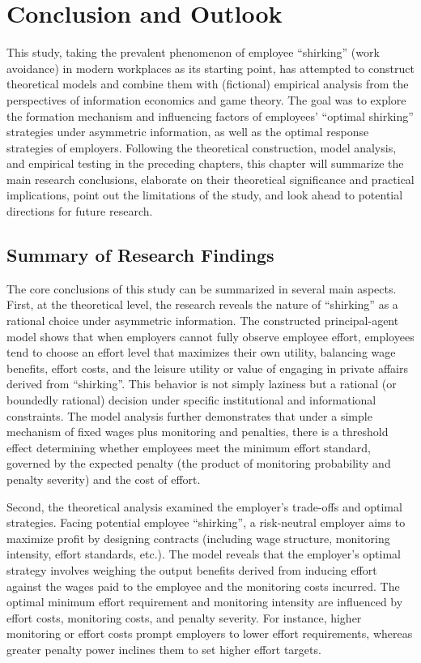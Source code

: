 \chapter{Conclusion and Outlook}
\label{chap:conclusion}

This study, taking the prevalent phenomenon of employee \enquote{shirking} (work avoidance) in modern workplaces as its starting point, has attempted to construct theoretical models and combine them with (fictional) empirical analysis from the perspectives of information economics and game theory. The goal was to explore the formation mechanism and influencing factors of employees' \enquote{optimal shirking} strategies under asymmetric information, as well as the optimal response strategies of employers. Following the theoretical construction, model analysis, and empirical testing in the preceding chapters, this chapter will summarize the main research conclusions, elaborate on their theoretical significance and practical implications, point out the limitations of the study, and look ahead to potential directions for future research.

\section{Summary of Research Findings}

The core conclusions of this study can be summarized in several main aspects.
First, at the theoretical level, the research reveals the nature of \enquote{shirking} as a rational choice under asymmetric information. The constructed principal-agent model shows that when employers cannot fully observe employee effort, employees tend to choose an effort level that maximizes their own utility, balancing wage benefits, effort costs, and the leisure utility or value of engaging in private affairs derived from \enquote{shirking}. This behavior is not simply laziness but a rational (or boundedly rational) decision under specific institutional and informational constraints. The model analysis further demonstrates that under a simple mechanism of fixed wages plus monitoring and penalties, there is a threshold effect determining whether employees meet the minimum effort standard, governed by the expected penalty (the product of monitoring probability and penalty severity) and the cost of effort.

Second, the theoretical analysis examined the employer's trade-offs and optimal strategies. Facing potential employee \enquote{shirking}, a risk-neutral employer aims to maximize profit by designing contracts (including wage structure, monitoring intensity, effort standards, etc.). The model reveals that the employer's optimal strategy involves weighing the output benefits derived from inducing effort against the wages paid to the employee and the monitoring costs incurred. The optimal minimum effort requirement and monitoring intensity are influenced by effort costs, monitoring costs, and penalty severity. For instance, higher monitoring or effort costs prompt employers to lower effort requirements, whereas greater penalty power inclines them to set higher effort targets.

